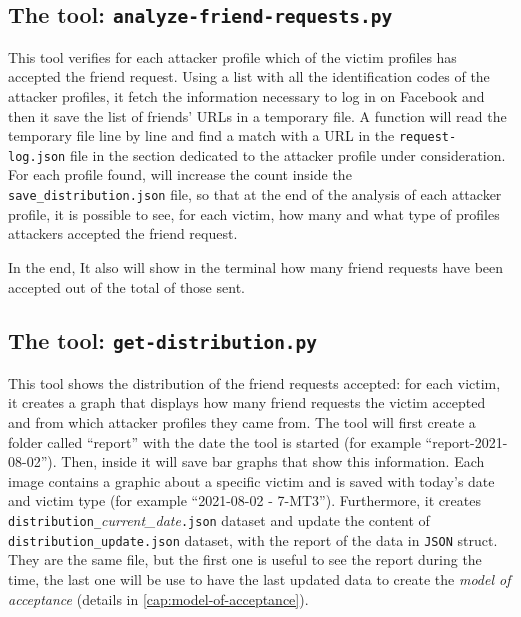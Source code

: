 \subsection{The tool: \texttt{analyze-friend-requests.py}}
This tool verifies for each attacker profile which of the victim profiles has accepted the friend request. Using a list with all the identification codes of the attacker profiles, it fetch the information necessary to log in on Facebook and then it save the list of friends' URLs in a temporary file. A function will read the temporary file line by line and find a match with a URL in the \texttt{request-log.json} file in the section dedicated to the attacker profile under consideration. For each profile found, will increase the count inside the \texttt{save\_distribution.json} file, so that at the end of the analysis of each attacker profile, it is possible to see, for each victim, how many and what type of profiles attackers accepted the friend request.\par \noindent 
In the end, It also will show in the terminal how many friend requests have been accepted out of the total of those sent.

\subsection{The tool: \texttt{get-distribution.py}}
\label{cap:distribution-update}
This tool shows the distribution of the friend requests accepted: for each victim, it creates a graph that displays how many friend requests the victim accepted and from which attacker profiles they came from. The tool will first create a folder called ``report'' with the date the tool is started (for example ``report-2021-08-02''). Then, inside it will save bar graphs that show this information. Each image contains a graphic about a specific victim and is saved with today's date and victim type (for example ``2021-08-02 - 7-MT3''). Furthermore, it creates \texttt{distribution\_}\textit{current\_date}\texttt{.json} dataset and update the content of \texttt{distribution\_update.json} dataset, with the report of the data in \texttt{JSON} struct. They are the same file, but the first one is useful to see the report during the time, the last one will be use to have the last updated data to create the \textit{model of acceptance} (details in \ref{cap:model-of-acceptance}). 

